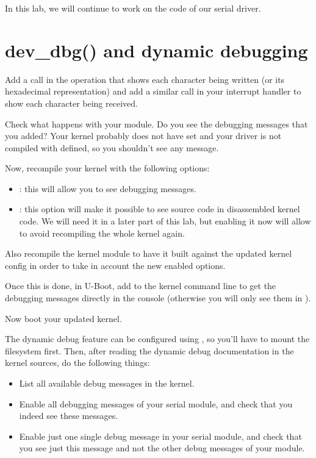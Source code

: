 
In this lab, we will continue to work on the code of our serial driver.

\section{dev\_dbg() and dynamic debugging}

Add a  call in the  operation that shows
each character being written (or its hexadecimal representation) and
add a similar  call in your interrupt handler to show
each character being received.

Check what happens with your module. Do you see the debugging messages
that you added? Your kernel probably does not have
 set and your driver is not compiled with
 defined, so you shouldn't see any message.

Now, recompile your kernel with the following options:

\begin{itemize}
\item {}: this will allow you to see
  debugging messages.
\item {}: this option will make it
  possible to see source code in disassembled kernel code.
  We will need it in a later part of this lab, but enabling
  it now will allow to avoid recompiling the whole kernel again.
\end{itemize}

Also recompile the kernel module to have it built against the updated kernel
config in order to take in account the new enabled options.

Once this is done, in U-Boot, add  to the kernel
command line to get the debugging messages directly in the console
(otherwise you will only see them in ).

Now boot your updated kernel.

The dynamic debug feature can be configured using , so you'll have
to mount the  filesystem first. Then, after reading the dynamic
debug documentation in the kernel sources, do the following things:

\begin{itemize}

\item List all available debug messages in the kernel.

\item Enable all debugging messages of your serial module, and check
  that you indeed see these messages.

\item Enable just one single debug message in your serial module, and
  check that you see just this message and not the other debug
  messages of your module.

\end{itemize}


